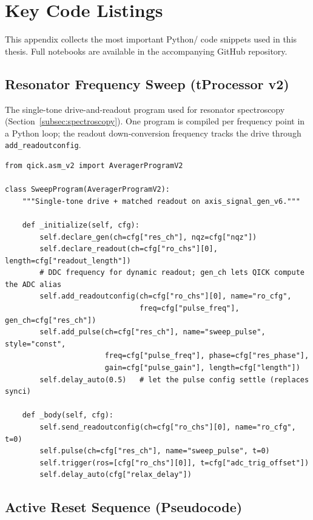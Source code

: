 \section{Key Code Listings}
\label{appendix:code}

This appendix collects the most important Python/\QICK{} code snippets used in
this thesis.  Full notebooks are available in the accompanying GitHub repository.

\subsection{Resonator Frequency Sweep (tProcessor v2)}

The single-tone drive-and-readout program used for resonator spectroscopy
(Section~\ref{subsec:spectroscopy}).  One program is compiled per frequency point
in a Python loop; the readout down-conversion frequency tracks the drive through
\texttt{add\_readoutconfig}.

\begin{verbatim}
from qick.asm_v2 import AveragerProgramV2

class SweepProgram(AveragerProgramV2):
    """Single-tone drive + matched readout on axis_signal_gen_v6."""

    def _initialize(self, cfg):
        self.declare_gen(ch=cfg["res_ch"], nqz=cfg["nqz"])
        self.declare_readout(ch=cfg["ro_chs"][0], length=cfg["readout_length"])
        # DDC frequency for dynamic readout; gen_ch lets QICK compute the ADC alias
        self.add_readoutconfig(ch=cfg["ro_chs"][0], name="ro_cfg",
                               freq=cfg["pulse_freq"], gen_ch=cfg["res_ch"])
        self.add_pulse(ch=cfg["res_ch"], name="sweep_pulse", style="const",
                       freq=cfg["pulse_freq"], phase=cfg["res_phase"],
                       gain=cfg["pulse_gain"], length=cfg["length"])
        self.delay_auto(0.5)   # let the pulse config settle (replaces synci)

    def _body(self, cfg):
        self.send_readoutconfig(ch=cfg["ro_chs"][0], name="ro_cfg", t=0)
        self.pulse(ch=cfg["res_ch"], name="sweep_pulse", t=0)
        self.trigger(ros=[cfg["ro_chs"][0]], t=cfg["adc_trig_offset"])
        self.delay_auto(cfg["relax_delay"])
\end{verbatim}

\subsection{Active Reset Sequence (Pseudocode)}

